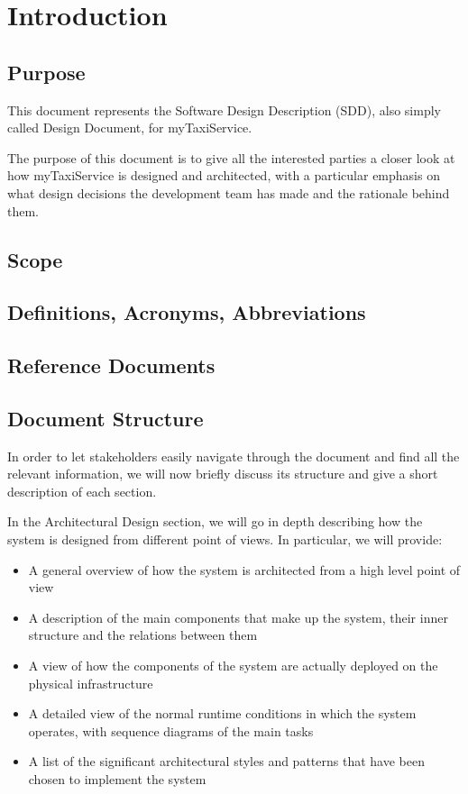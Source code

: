 \chapter{Introduction}

\section{Purpose}
This document represents the Software Design Description (SDD), also simply called Design Document, for myTaxiService.

The purpose of this document is to give all the interested parties a closer look at how myTaxiService is designed and architected, with a particular emphasis on what design decisions the development team has made and the rationale behind them.


\section{Scope}

\section{Definitions, Acronyms, Abbreviations}

\section{Reference Documents}
  
\section{Document Structure}
In order to let stakeholders easily navigate through the document and find all the relevant information, we will now briefly discuss its structure and give a short description of each section.

In the Architectural Design section, we will go in depth describing how the system is designed from different point of views. In particular, we will provide: 
	\begin{itemize}
	\item A general overview of how the system is architected from a high level point of view
	\item A description of the main components that make up the system, their inner structure and the relations between them
	\item A view of how the components of the system are actually deployed on the physical infrastructure 
	\item A detailed view of the normal runtime conditions in which the system operates, with sequence diagrams of the main tasks
	\item A list of the significant architectural styles and patterns that have been chosen to implement the system
	\end{itemize}
	
